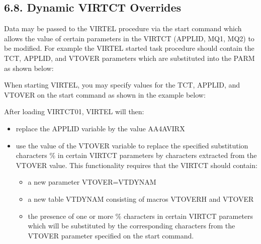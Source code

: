 \documentclass[letterpaper,10pt,english]{sphinxmanual}
\begin{document}
\subsection{6.8. Dynamic VIRTCT Overrides}
\label{\detokenize{Installation_Guide:dynamic-virtct-overrides}}
Data may be passed to the VIRTEL procedure via the start command which allows the value of certain parameters in the VIRTCT (APPLID, MQ1, MQ2) to be modified. For example the VIRTEL started task procedure should contain the TCT, APPLID, and VTOVER parameters which are substituted into the PARM as shown below:

\begin{sphinxVerbatim}[commandchars=\\\{\}]
  
 
 
\end{sphinxVerbatim}

When starting VIRTEL, you may specify values for the TCT, APPLID, and VTOVER on the start command as shown in the example below:

\begin{sphinxVerbatim}[commandchars=\\\{\}]
 
\end{sphinxVerbatim}

After loading VIRTCT01, VIRTEL will then:
\begin{itemize}
\item {} 
replace the APPLID variable by the value AA4AVIRX

\item {} 
use the value of the VTOVER variable to replace the specified substitution characters \% in certain VIRTCT parameters by characters extracted from the VTOVER value. This functionality requires that the VIRTCT should contain:
\begin{itemize}
\item {} 
a new parameter VTOVER=VTDYNAM

\item {} 
a new table VTDYNAM consisting of macros VTOVERH and VTOVER

\item {} 
the presence of one or more \% characters in certain VIRTCT parameters which will be substituted by the corresponding characters from the VTOVER parameter specified on the start command.

\end{itemize}

\end{itemize}
\end{document}
